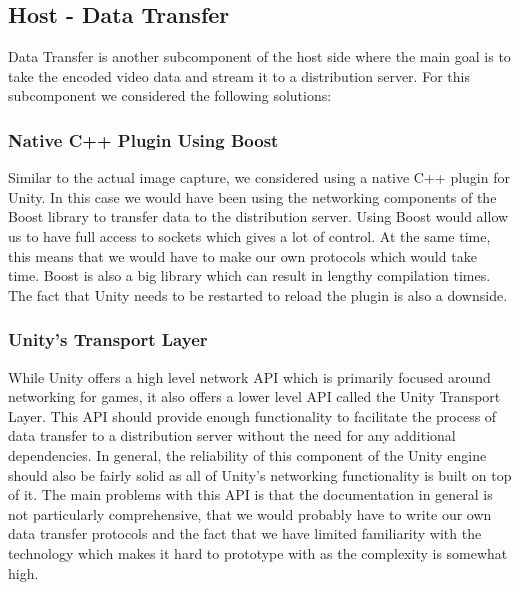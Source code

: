 
\subsection{Host - Data Transfer} %
Data Transfer is another subcomponent of the host side where the main goal is to take the encoded video data and stream it to a distribution server. For this subcomponent we considered the following solutions:

\subsubsection{Native C++ Plugin Using Boost}
Similar to the actual image capture, we considered using a native C++ plugin for Unity. In this case we would have been using the networking components of the Boost library\cite{boost} to transfer data to the distribution server. Using Boost would allow us to have full access to sockets which gives a lot of control. At the same time, this means that we would have to make our own protocols which would take time. Boost is also a big library which can result in lengthy compilation times. The fact that Unity needs to be restarted to reload the plugin is also a downside. 

\subsubsection{Unity's Transport Layer}
While Unity offers a high level network API which is primarily focused around networking for games, it also offers a lower level API called the Unity Transport Layer\cite{unity_transportLayer}. This API should provide enough functionality to facilitate the process of data transfer to a distribution server without the need for any additional dependencies. In general, the reliability of this component of the Unity engine should also be fairly solid as all of Unity's networking functionality is built on top of it. The main problems with this API is that the documentation in general is not particularly comprehensive, that we would probably have to write our own data transfer protocols and the fact that we have limited familiarity with the technology which makes it hard to prototype with as the complexity is somewhat high. 

